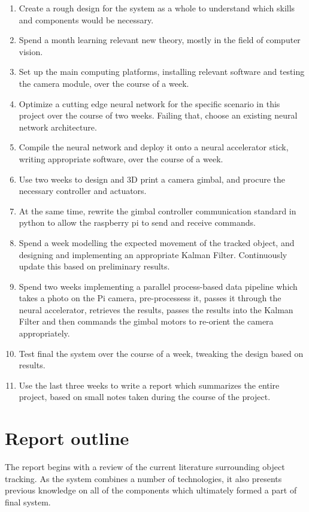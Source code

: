 \begin{enumerate}
\item Create a rough design for the system as a whole to understand which skills and components would be necessary.
\item Spend a month learning relevant new theory, mostly in the field of computer vision.
\item Set up the main computing platforms, installing relevant software and testing the camera module, over the course of a week.
\item Optimize a cutting edge neural network for the specific scenario in this project over the course of two weeks. Failing that, choose an existing neural network architecture.
\item Compile the neural network and deploy it onto a neural accelerator stick, writing appropriate software, over the course of a week.
\item Use two weeks to design and 3D print a camera gimbal, and procure the necessary controller and actuators.
\item At the same time, rewrite the gimbal controller communication standard in python to allow the raspberry pi to send and receive commands.
\item Spend a week modelling the expected movement of the tracked object, and designing and implementing an appropriate Kalman Filter. Continuously update this based on preliminary results.
\item Spend two weeks implementing a parallel process-based data pipeline which takes a photo on the Pi camera, pre-processess it, passes it through the neural accelerator, retrieves the results, passes the results into the Kalman Filter and then commands the gimbal motors to re-orient the camera appropriately. 
\item Test final the system over the course of a week, tweaking the design based on results.
\item Use the last three weeks to write a report which summarizes the entire project, based on small notes taken during the course of the project.
\end{enumerate}



\section{Report outline}

The report begins with a review of the current literature surrounding object tracking. As the system combines a number of technologies, it also presents previous knowledge on all of the components which ultimately formed a part of final system.

